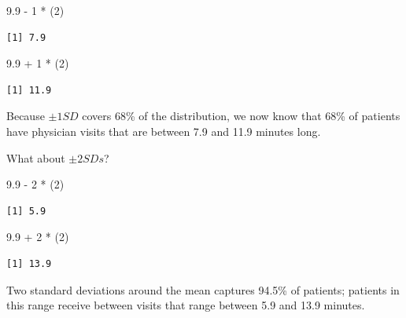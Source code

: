\documentclass[
  11pt,
]{book}
\newenvironment{Shaded}{\begin{snugshade}}{\end{snugshade}}
\newcommand{\DecValTok}[1]{\textcolor[rgb]{0.00,0.00,0.81}{#1}}
\newcommand{\FloatTok}[1]{\textcolor[rgb]{0.00,0.00,0.81}{#1}}
\newcommand{\NormalTok}[1]{#1}
\newcommand{\SpecialCharTok}[1]{\textcolor[rgb]{0.00,0.00,0.00}{#1}}
\begin{document}
\begin{Shaded}
\begin{Highlighting}[]
\FloatTok{9.9} \SpecialCharTok{{-}} \DecValTok{1} \SpecialCharTok{*}\NormalTok{ (}\DecValTok{2}\NormalTok{)}
\end{Highlighting}
\end{Shaded}

\begin{verbatim}
[1] 7.9
\end{verbatim}

\begin{Shaded}
\begin{Highlighting}[]
\FloatTok{9.9} \SpecialCharTok{+} \DecValTok{1} \SpecialCharTok{*}\NormalTok{ (}\DecValTok{2}\NormalTok{)}
\end{Highlighting}
\end{Shaded}

\begin{verbatim}
[1] 11.9
\end{verbatim}

Because \(\pm 1SD\) covers 68\% of the distribution, we now know that 68\% of patients have physician visits that are between 7.9 and 11.9 minutes long.

What about \(\pm 2SDs\)?

\begin{Shaded}
\begin{Highlighting}[]
\FloatTok{9.9} \SpecialCharTok{{-}} \DecValTok{2} \SpecialCharTok{*}\NormalTok{ (}\DecValTok{2}\NormalTok{)}
\end{Highlighting}
\end{Shaded}

\begin{verbatim}
[1] 5.9
\end{verbatim}

\begin{Shaded}
\begin{Highlighting}[]
\FloatTok{9.9} \SpecialCharTok{+} \DecValTok{2} \SpecialCharTok{*}\NormalTok{ (}\DecValTok{2}\NormalTok{)}
\end{Highlighting}
\end{Shaded}

\begin{verbatim}
[1] 13.9
\end{verbatim}

Two standard deviations around the mean captures 94.5\% of patients; patients in this range receive between visits that range between 5.9 and 13.9 minutes.
\end{document}
